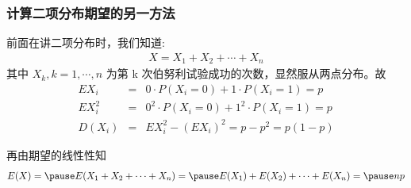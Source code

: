 \documentclass[Prob-All.tex]{subfiles}
\begin{document}
	\begin{frame}
		\frametitle{计算二项分布期望的另一方法}
		前面在讲二项分布时，我们知道:
		\begin{eqnarray*}
			X=X_1+X_2+\cdots+X_n
		\end{eqnarray*}
		其中 $X_k, k=1,\cdots, n$ 为第 k 次伯努利试验成功的次数，显然服从两点分布。故 \pause
		\begin{eqnarray*}
			EX_i&=&0\cdot P(X_i=0)+1\cdot P(X_i=1)=p\\
			EX_i^2&=&0^2\cdot P(X_i=0)+1^2\cdot P(X_i=1)=p\\
			D(X_i)&=&EX_i^2-(EX_i)^2=p-p^2=p(1-p)
		\end{eqnarray*}


		\pause 再由期望的线性性知
		\begin{eqnarray*}
			E(X)=\pause E(X_1+X_2+\cdots+X_n)=\pause E(X_1)+E(X_2)+\cdots +E(X_n)=\pause np
		\end{eqnarray*}
	\end{frame}
\end{document}
